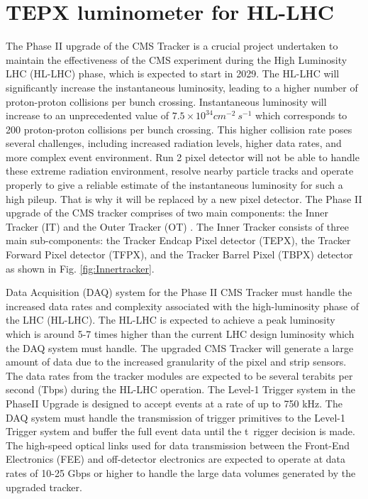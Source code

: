 \chapter{TEPX luminometer for HL-LHC}  %

\ifpdf
    \graphicspath{{Chapter7/Figs/Raster/}{Chapter7/Figs/PDF/}{Chapter7/Figs/}}
\else
    \graphicspath{{Chapter7/Figs/Vector/}{Chapter7/Figs/}}
\fi

The Phase II upgrade of the CMS Tracker is a crucial project undertaken to maintain the effectiveness of the CMS experiment during the High Luminosity LHC (HL-LHC) phase, which is expected to start in 2029. The HL-LHC will significantly increase the instantaneous luminosity, leading to a higher number of proton-proton collisions per bunch crossing. Instantaneous luminosity will increase to an unprecedented value of $7.5 \times 10^{34} cm^{-2} \: s^{-1}$ which corresponds to 200 proton-proton collisions per bunch crossing. This higher collision rate poses several challenges, including increased radiation levels, higher data rates, and more complex event environment. Run 2 pixel detector will not be able to handle these extreme radiation environment, resolve nearby particle tracks and operate properly to give a reliable estimate of the instantaneous luminosity for such a high pileup. That is why it will be replaced by a new pixel detector. The Phase II upgrade of the CMS tracker comprises of two main components: the Inner Tracker (IT) and the Outer Tracker (OT) \cite{collaboration:2759074}. The Inner Tracker consists of three main sub-components: the Tracker Endcap Pixel detector (TEPX), the Tracker Forward Pixel detector (TFPX), and the Tracker Barrel Pixel (TBPX) detector as shown in Fig. \ref{fig:Innertracker}.  %

Data Acquisition (DAQ) system for the Phase II CMS Tracker must handle the increased data rates and complexity associated with the high-luminosity phase of the LHC (HL-LHC). The HL-LHC is expected to achieve a peak luminosity which is around 5-7 times higher than the current LHC design luminosity which the DAQ system must handle. The upgraded CMS Tracker will generate a large amount of data due to the increased granularity of the pixel and strip sensors. The data rates from the tracker modules are expected to be several terabits per second (Tbps) during the HL-LHC operation. The Level-1 Trigger system in the PhaseII Upgrade is designed to accept events at a rate of up to 750 kHz. The DAQ system must handle the transmission of trigger primitives to the Level-1 Trigger system and buffer the full event data until the t\
rigger decision is made. The high-speed optical links used for data transmission between the Front-End Electronics (FEE) and off-detector electronics are expected to operate at data rates of 10-25 Gbps or higher to handle the large data volumes generated by the upgraded tracker.

